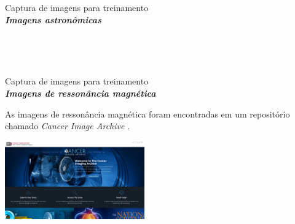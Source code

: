 \documentclass{beamer}
\begin{document}
\begin{frame}{Captura de imagens para treinamento}{\thesection \, \secname \\ \textbf{\textit{Imagens astronômicas}}}
\begin{figure}
            \\
        \end{figure} \\


    \end{frame}

    \begin{frame}{Captura de imagens para treinamento}{\thesection \, \secname \\ \textbf{\textit{Imagens de ressonância magnética}}}

        As imagens de ressonância magnética foram encontradas em um repositório chamado \textit{Cancer Image Archive} \cite{cancer_imaging_archive_cancer_2022}.

        \vspace{0.2cm}
        
        \centering
        \includegraphics[width=6cm]{img/cancer_imaging_archive.png} \\

    \end{frame}
    
\end{document}
